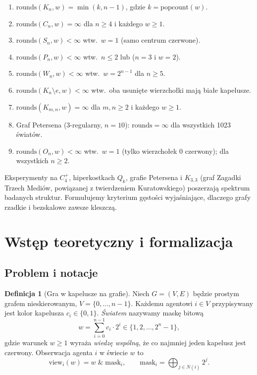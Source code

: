 \documentclass[12pt,a4paper]{article}
\theoremstyle{plain}
\theoremstyle{definition}
\newtheorem{definition}[theorem]{Definicja}
\theoremstyle{remark}
\newcommand{\rounds}{\mathrm{rounds}}
\newcommand{\popcount}{\mathrm{popcount}}
\newcommand{\view}{\mathrm{view}}
\newcommand{\mask}{\mathrm{mask}}
\begin{document}
\begin{enumerate}
  \item $\rounds(K_n, w) = \min(k, n-1)$, gdzie $k = \popcount(w)$.
  \item $\rounds(C_n, w) = \infty$ dla $n \ge 4$ i każdego $w \ge 1$.
  \item $\rounds(S_n, w) < \infty$ wtw.\ $w = 1$ (samo centrum czerwone).
  \item $\rounds(P_n, w) < \infty$ wtw.\ $n \le 2$ lub ($n = 3$ i $w = 2$).
  \item $\rounds(W_n, w) < \infty$ wtw.\ $w = 2^{n-1}$ dla $n \ge 5$.
  \item $\rounds(K_n\setminus e, w) < \infty$ wtw.\ oba usunięte wierzchołki mają białe kapelusze.
  \item $\rounds(K_{m,n}, w) = \infty$ dla $m,n \ge 2$ i każdego $w \ge 1$.
  \item Graf Petersena (3-regularny, $n=10$): $\rounds = \infty$ dla wszystkich 1023 światów.
  \item $\rounds(O_n, w) < \infty$ wtw.\ $w = 1$ (tylko wierzchołek 0 czerwony); dla wszystkich $n \ge 2$.
\end{enumerate}

Eksperymenty na $C_4^+$, hiperkostkach $Q_k$, grafie Petersena i $K_{3,3}$ (graf Zagadki Trzech Mediów, powiązanej z twierdzeniem Kuratowskiego) poszerzają spektrum badanych struktur. Formułujemy kryterium gęstości wyjaśniające, dlaczego grafy rzadkie i bezskalowe zawsze kleszczą.

\section{Wstęp teoretyczny i formalizacja}

\subsection{Problem i notacje}

\begin{definition}[Gra w kapelusze na grafie]
Niech $G = (V, E)$ będzie prostym grafem nieskierowanym, $V = \{0,\ldots,n{-}1\}$. Każdemu agentowi $i \in V$ przypisywany jest kolor kapelusza $c_i \in \{0,1\}$. \emph{Światem} nazywamy maskę bitową
$$w = \sum_{i=0}^{n-1} c_i \cdot 2^i \in \{1, 2, \ldots, 2^n - 1\},$$
gdzie warunek $w \ge 1$ wyraża \emph{wiedzę wspólną}, że co najmniej jeden kapelusz jest czerwony. Obserwacja agenta $i$ w świecie $w$ to
$$\view_i(w) = w \;\&\; \mask_i, \qquad \mask_i = \bigoplus_{j \in N(i)} 2^j.$$
\end{definition}
\end{document}
